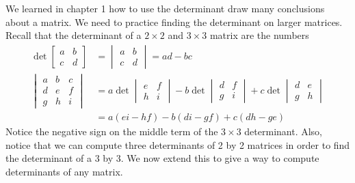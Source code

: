 \documentclass[letterpaper,oneside]{book}%
\theoremstyle{plain}
\theoremstyle{box}
\theoremstyle{problem}
\begin{document}
We learned in chapter 1 how to use the determinant draw many conclusions about a matrix.  We need to practice finding the determinant on larger matrices. 
Recall that the determinant of a {$2\times 2$} and {$3\times 3$} matrix are the numbers 
\begin{align*}
\det\begin{bmatrix}a&b\\c&d\end{bmatrix} &=\begin{vmatrix}a&b\\c&d\end{vmatrix} = ad-bc\\
\begin{vmatrix}a&b&c\\d&e&f\\g&h&i\end{vmatrix} &= a\det\begin{vmatrix}e&f\\h&i\end{vmatrix} -b\det\begin{vmatrix}d&f\\g&i\end{vmatrix} +c\det\begin{vmatrix}d&e\\g&h\end{vmatrix}\\
&=a(ei-hf)-b(di-gf)+c(dh-ge)
\end{align*}
Notice the negative sign on the middle term of the {$3 \times 3$} determinant. 
Also, notice that we can compute three determinants of 2 by 2 matrices in order to find the determinant of a 3 by 3. We now extend this to give a way to compute determinants of any matrix.
\end{document}
